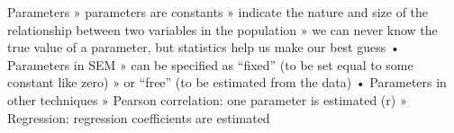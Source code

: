 Parameters
» parameters are constants
» indicate the nature and size of the
relationship between two variables in the
population
» we can never know the true value of a
parameter, but statistics help us make our
best guess
• Parameters in SEM
» can be specified as “fixed” (to be set equal
to some constant like zero)
» or “free” (to be estimated from the data)
• Parameters in other techniques
» Pearson correlation: one parameter is
estimated (r)
» Regression: regression coefficients are
estimated
